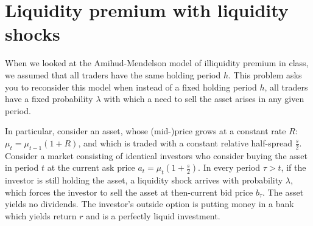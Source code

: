 \documentclass[a4paper]{article}
\newif\ifsolutions
\begin{document}
\ifsolutions
\subsection*{Solution}
	\begin{enumerate}
		\item A major shareholder sent a signal that they might not agree to the buyout, reducing the probability that other investors will receive the buyout value of \$54.20 (which is above the market consensus valuation), which reduced the expected payoff of twitter stock as perceived by the investors.
		
		(The Prince also claimed the fundamental value is above \$54.20, which should have been a good signal about the fundamental value but wasn't, possibly because other traders disagree or did not find this claim credible.)
		
		
		\item More explanations are possible, but the simplest ones are: (1) The Prince values Twitter stock more than other investors due to some idiosyncratic preference (like it giving him access to internal Twitter data that could be used for political purposes); (2) the Prince has some insider/private information about Twitter's true value; (3) investors vary in their risk-aversion, with most investors being more risk-averse than the Prince and thus having lower valuation of the Twitter stock, which leads to the market valuation being lower as well.
	\end{enumerate}
\fi



\section{Liquidity premium with liquidity shocks}
	When we looked at the Amihud-Mendelson model of illiquidity premium in class, we assumed that all traders have the same holding period $h$. This problem asks you to reconsider this model when instead of a fixed holding period $h$, all traders have a fixed probability $\lambda$ with which a need to sell the asset arises in any given period.
	
	In particular, consider an asset, whose (mid-)price grows at a constant rate $R$: $\mu_t = \mu_{t-1} (1+R)$, and which is traded with a constant relative half-spread $\frac{s}{2}$. Consider a market consisting of identical investors who consider buying the asset in period $t$ at the current ask price $a_t = \mu_t \left(1+\frac{s}{2}\right)$. In every period $\tau > t$, if the investor is still holding the asset, a liquidity shock arrives with probability $\lambda$, which forces the investor to sell the asset at then-current bid price $b_\tau$. The asset yields no dividends.
	The investor's outside option is putting money in a bank which yields return $r$ and is a perfectly liquid investment.
	
\end{document}
